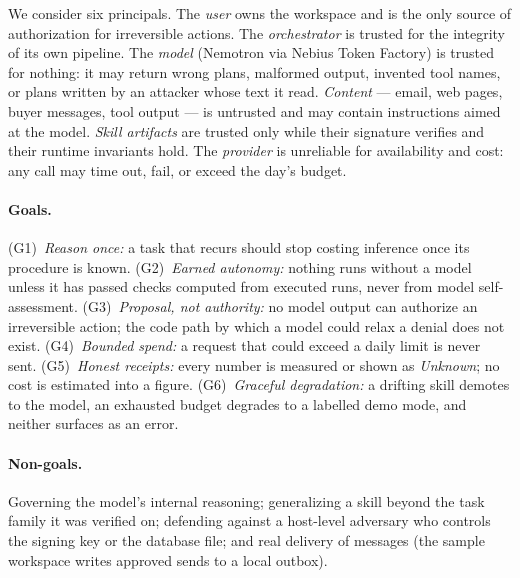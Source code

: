 \documentclass[11pt]{article}
\begin{document}
We consider six principals. The \emph{user} owns the workspace and is the only source of authorization for
irreversible actions. The \emph{orchestrator} is trusted for the integrity of its own pipeline. The \emph{model}
(Nemotron via Nebius Token Factory) is trusted for nothing: it may return wrong plans, malformed output, invented tool
names, or plans written by an attacker whose text it read. \emph{Content} --- email, web pages, buyer messages, tool
output --- is untrusted and may contain instructions aimed at the model. \emph{Skill artifacts} are trusted only while
their signature verifies and their runtime invariants hold. The \emph{provider} is unreliable for availability and
cost: any call may time out, fail, or exceed the day's budget.

\paragraph{Goals.} (G1)~\emph{Reason once:} a task that recurs should stop costing inference once its procedure is
known. (G2)~\emph{Earned autonomy:} nothing runs without a model unless it has passed checks computed from executed
runs, never from model self-assessment. (G3)~\emph{Proposal, not authority:} no model output can authorize an
irreversible action; the code path by which a model could relax a denial does not exist. (G4)~\emph{Bounded spend:} a
request that could exceed a daily limit is never sent. (G5)~\emph{Honest receipts:} every number is measured or shown
as \emph{Unknown}; no cost is estimated into a figure. (G6)~\emph{Graceful degradation:} a drifting skill demotes to
the model, an exhausted budget degrades to a labelled demo mode, and neither surfaces as an error.

\paragraph{Non-goals.} Governing the model's internal reasoning; generalizing a skill beyond the task family it was
verified on; defending against a host-level adversary who controls the signing key or the database file; and real
delivery of messages (the sample workspace writes approved sends to a local outbox).
\end{document}
